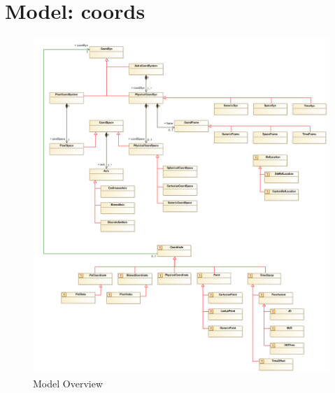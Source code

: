 
%



    
    
    
      

\pagebreak
\section{Model: coords }
  
  \begin{figure}[h]
  \begin{center}
    \includegraphics[width=\textwidth]{diagrams/Overview.png}
    \caption{Model Overview}\label{fig:overview}
  \end{center}
  \end{figure}

